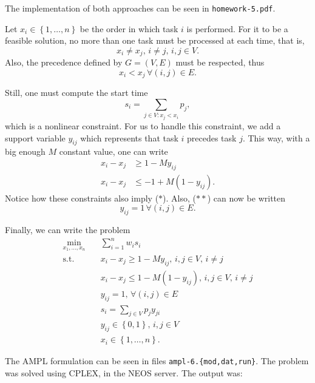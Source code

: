 \documentclass[a4paper]{report}
\begin{document}
The implementation of both approaches can be seen in \texttt{homework-5.pdf}.



Let $x_i \in \left\{ 1,\ldots,n \right\} $ be the order in which task $i$ is performed. For it to be a feasible solution, no more than one task must be processed at each time, that is, \[
x_i \neq x_j ,\, i\neq j,\, i,j \in V \tag{$*$}
.\] Also, the precedence defined by $G=\left( V,E \right) $ must be respected, thus \[
x_i < x_j\,\forall \left( i,j \right) \in E \tag{$**$}
.\]

Still, one must compute the start time \[
s_i = \sum_{j \in V : x_j < x_i } p_j
,\] which is a nonlinear constraint. For us to handle this constraint, we add a support variable $y_{ij}$ which represents that task $i$ precedes task $j$. This way, with a big enough $M$ constant value, one can write
\begin{align*}
    x_i - x_j &\ge 1 - My_{ij} \\
    x_i - x_j &\le -1 + M \left( 1 -  y_{ij}\right)
.\end{align*}
Notice how these constraints also imply ($*$). Also, ($**$) can now be written \[
y_{ij} = 1\,\forall \left( i,j \right) \in E 
.\] 

Finally, we can write the problem
\begin{align*}
    \min_{x_1,\ldots,x_n} \quad & \sum_{i=1}^{n} w_i s_i \\
    \textrm{s.t.} \quad & x_i - x_j \ge 1 - My_{ij},\, i,j \in V ,\, i\neq j \\
      & x_i - x_j \le  1 - M \left( 1 - y_{ij}\right) ,\, i,j \in V ,\, i\neq j \\
      & y_{ij} = 1,\, \forall \left( i,j \right) \in E \\
      & s_i = \sum_{j \in V} p_j y_{ji} \\
      & y_{ij} \in \left\{ 0,1 \right\},\, i,j \in V \\
      & x_i \in \left\{ 1,\ldots,n \right\}
.\end{align*}

The AMPL formulation can be seen in files \texttt{ampl-6.\{mod,dat,run\}}. The problem was solved using CPLEX, in the NEOS server. The output was:
\end{document}
